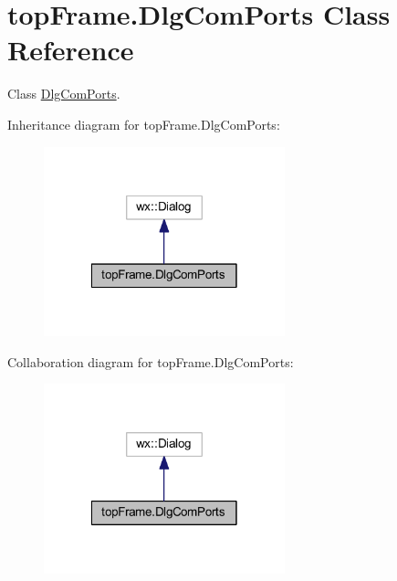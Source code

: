 \hypertarget{classtop_frame_1_1_dlg_com_ports}{\section{top\-Frame.\-Dlg\-Com\-Ports Class Reference}
\label{classtop_frame_1_1_dlg_com_ports}
}


Class \hyperlink{classtop_frame_1_1_dlg_com_ports}{Dlg\-Com\-Ports}.  




Inheritance diagram for top\-Frame.\-Dlg\-Com\-Ports\-:\nopagebreak
\begin{figure}[H]
\begin{center}
\leavevmode
\includegraphics[width=198pt]{classtop_frame_1_1_dlg_com_ports__inherit__graph}
\end{center}
\end{figure}


Collaboration diagram for top\-Frame.\-Dlg\-Com\-Ports\-:\nopagebreak
\begin{figure}[H]
\begin{center}
\leavevmode
\includegraphics[width=198pt]{classtop_frame_1_1_dlg_com_ports__coll__graph}
\end{center}
\end{figure}
